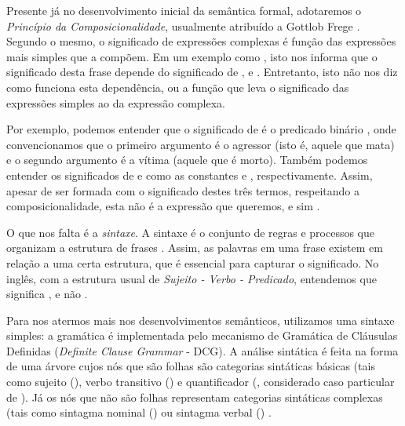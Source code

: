 Presente já no desenvolvimento inicial da semântica formal, adotaremos o \textit{Princípio da Composicionalidade}, usualmente atribuído a Gottlob Frege \cite[p.~94]{BlackburnBos:2005}.
%
%
Segundo o mesmo, o significado de expressões complexas é função das expressões mais simples que a compõem. Em um exemplo como , isto nos informa que o significado desta frase depende do significado de ,  e . Entretanto, isto não nos diz como funciona esta dependência, ou a função que leva o significado das expressões simples ao da expressão complexa.

Por exemplo, podemos entender que o significado de  é o predicado binário , onde convencionamos que o primeiro argumento é o agressor (isto é, aquele que mata) e o segundo argumento é a vítima (aquele que é morto). Também podemos entender os significados de  e  como as constantes  e , respectivamente. Assim, apesar de  ser formada com o significado destes três termos, respeitando a composicionalidade, esta não é a expressão que queremos, e sim .

O que nos falta é a \textit{sintaxe}. A sintaxe é o conjunto de regras e processos que organizam a estrutura de frases \citep[p.~2]{vanEijck:2010}. Assim, as palavras em uma frase existem em relação a uma certa estrutura, que é essencial para capturar o significado. No inglês, com a estrutura usual de \textit{Sujeito - Verbo - Predicado}, entendemos que  significa , e não .

Para nos atermos mais nos desenvolvimentos semânticos, 
%
%
utilizamos uma sintaxe simples: a gramática é implementada pelo mecanismo de Gramática de Cláusulas Definidas (\textit{Definite Clause Grammar} - DCG). A análise sintática é feita na forma de uma árvore cujos nós que são folhas são categorias sintáticas básicas (tais como sujeito (), verbo transitivo () e quantificador (, considerado caso particular de ). Já os nós que não são folhas representam categorias sintáticas complexas (tais como sintagma nominal () ou sintagma verbal () \cite[p.~58]{BlackburnBos:2005}. %

